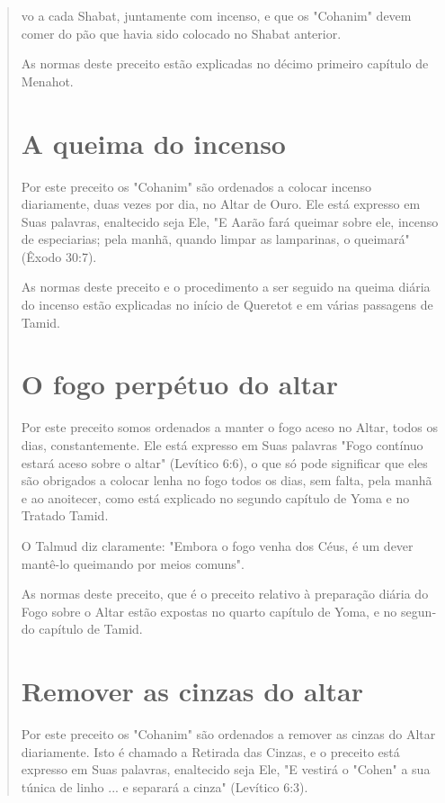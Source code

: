 \begin{quote}


vo a cada Shabat, juntamente com incenso, e que os "Cohanim" devem comer
do pão que havia sido colocado no Shabat anterior.

As normas deste preceito estão explicadas no décimo primeiro capí­tulo
de Menahot.

\section{A queima do incenso}

Por este preceito os "Cohanim" são ordenados a colocar incenso
diariamente, duas vezes por dia, no Altar de Ouro. Ele está expresso em
Suas palavras, enaltecido seja Ele, "E Aarão fará queimar sobre ele,
incenso de espe­ciarias; pela manhã, quando limpar as lamparinas, o
queimará" (Êxodo 30:7).

As normas deste preceito e o procedimento a ser seguido na queima diária
do incenso estão explicadas no início de Queretot e em várias passagens
de Tamid.

\section{O fogo perpétuo do altar}

Por este preceito somos ordenados a manter o fogo aceso no Altar, todos
os dias, constantemente. Ele está expresso em Suas palavras "Fogo
con­tínuo estará aceso sobre o altar" (Levítico 6:6), o que só pode
significar que eles são obrigados a colocar lenha no fogo todos os dias,
sem falta, pela manhã e ao anoitecer, como está explicado no segundo
capítulo de Yoma e no Trata­do Tamid.

O Talmud diz claramente: "Embora o fogo venha dos Céus, é um dever
mantê-lo queimando por meios comuns".

As normas deste preceito, que é o preceito relativo à preparação diária
do Fogo sobre o Altar estão expostas no quarto capítulo de Yoma, e no
segun­do capítulo de Tamid.

\section{Remover as cinzas do altar}

Por este preceito os "Cohanim" são ordenados a remover as cinzas do
Altar diariamente. Isto é chamado a Retirada das Cinzas, e o preceito
está expresso em Suas palavras, enaltecido seja Ele, "E vestirá o
"Cohen" a sua tú­nica de linho ... e separará a cinza" (Levítico 6:3).


\end{quote}
